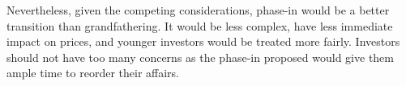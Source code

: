 Nevertheless, given the competing considerations, phase-in would be a better transition than grandfathering. It would be less complex, have less immediate impact on prices, and younger investors would be treated more fairly. Investors should not have too many concerns as the phase-in proposed would give them ample time to reorder their affairs. \enlargethispage{-0.5\baselineskip}
















\clearpage
%



